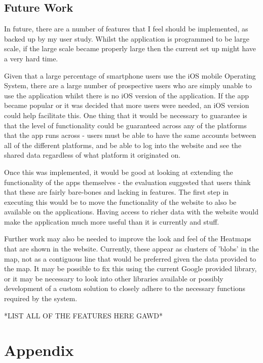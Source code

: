 \documentclass{l4proj}
\begin{document}
\section{Future Work}

In future, there are a number of features that I feel should be implemented, as backed up by my user study. Whilst the application is programmed to be large scale, if the large scale became properly large then the current set up might have a very hard time.

Given that a large percentage of smartphone users use the iOS mobile Operating System, there are a large number of prospective users who are simply unable to use the application whilst there is no iOS version of the application. If the app became popular or it was decided that more users were needed, an iOS version could help facilitate this. One thing that it would be necessary to guarantee is that the level of functionality could be guaranteed across any of the platforms that the app runs across - users must be able to have the same accounts between all of the different platforms, and be able to log into the website and see the shared data regardless of what platform it originated on.

Once this was implemented, it would be good at looking at extending the functionality of the apps themselves - the evaluation suggested that users think that these are fairly bare-bones and lacking in features. The first step in executing this would be to move the functionality of the website to also be available on the applications. Having access to richer data with the website would make the application much more useful than it is currently and stuff.

Further work may also be needed to improve the look and feel of the Heatmaps that are shown in the website. Currently, these appear as clusters of 'blobs' in the map, not as a contiguous line that would be preferred given the data provided to the map. It may be possible to fix this using the current Google provided library, or it may be necessary to look into other libraries available or possibly development of a custom solution to closely adhere to the necessary functions required by the system. 

*LIST ALL OF THE FEATURES HERE GAWD*


\chapter{Appendix}
\end{document}
